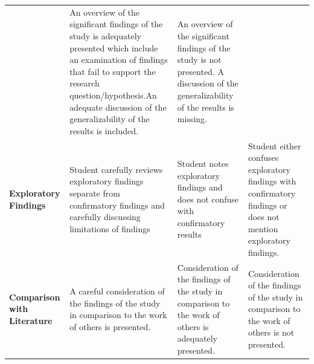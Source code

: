 \documentclass[
  openany]{book}
\begin{document}
\begin{longtable}[]{@{}llll@{}}
\begin{minipage}[t]{0.22\columnwidth}
\end{minipage} & \begin{minipage}[t]{0.22\columnwidth}\raggedright
An overview of the significant findings of the study is adequately presented which include an examination of findings that fail to support the research question/hypothesis.An adequate discussion of the generalizability of the results is included.\strut
\end{minipage} & \begin{minipage}[t]{0.22\columnwidth}\raggedright
An overview of the significant findings of the study is not presented. A discussion of the generalizability of the results is missing.\strut
\end{minipage}\tabularnewline
\begin{minipage}[t]{0.22\columnwidth}\raggedright
\textbf{Exploratory Findings}\strut
\end{minipage} & \begin{minipage}[t]{0.22\columnwidth}\raggedright
Student carefully reviews exploratory findings separate from confirmatory findings and carefully discussing limitations of findings\strut
\end{minipage} & \begin{minipage}[t]{0.22\columnwidth}\raggedright
Student notes exploratory findings and does not confuse with confirmatory results\strut
\end{minipage} & \begin{minipage}[t]{0.22\columnwidth}\raggedright
Student either confuses exploratory findings with confirmatory findings or does not mention exploratory findings.\strut
\end{minipage}\tabularnewline
\begin{minipage}[t]{0.22\columnwidth}\raggedright
\textbf{Comparison with Literature}\strut
\end{minipage} & \begin{minipage}[t]{0.22\columnwidth}\raggedright
A careful consideration of the findings of the study in comparison to the work of others is presented.\strut
\end{minipage} & \begin{minipage}[t]{0.22\columnwidth}\raggedright
Consideration of the findings of the study in comparison to the work of others is adequately presented.\strut
\end{minipage} & \begin{minipage}[t]{0.22\columnwidth}\raggedright
Consideration of the findings of the study in comparison to the work of others is not presented.\strut

\end{minipage}
\end{longtable}
\end{document}
